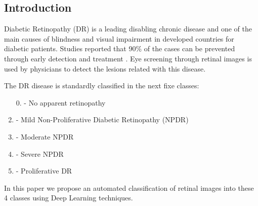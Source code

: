 \documentclass[a0,portrait]{a0poster}
\begin{document}
\vspace{1cm} %


\begin{multicols}{3} %


\color{Navy} %



\color{SaddleBrown} %

\section*{Introduction}

Diabetic Retinopathy (DR) is a leading disabling chronic disease  and  one of the main causes of blindness and visual impairment in developed countries for diabetic patients. Studies reported that 90\% of the cases can be prevented through early detection and treatment \cite{torrents15}. Eye screening through retinal images is used by physicians to detect the lesions related with this disease. 

The DR disease is standardly classified \cite{diaclass} in the next fixe classes:

\begin{enumerate}
	\item [0.]\setcounter{enumi}{0} - No apparent retinopathy
	\item - Mild Non-Proliferative Diabetic Retinopathy (NPDR)
	\item - Moderate NPDR
	\item - Severe NPDR
	\item - Proliferative DR
\end{enumerate}

In this paper we propose an automated classification of retinal images into these 4 classes using Deep Learning techniques. 


\end{multicols}
\end{document}
